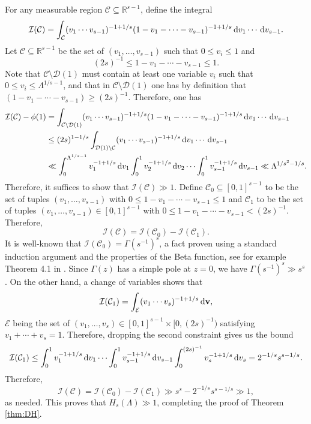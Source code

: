 \documentclass[11pt,reqno]{amsart}
\numberwithin{equation}{section}
\renewcommand{\d}{\,{\rm d}}
\begin{document}
For any measurable region $\mathcal{C} \subseteq \mathbb{R}^{s-1}$, define the integral
\[\mathcal{I}(\mathcal{C}) = \int_{\mathcal{C}} (v_1\cdots v_{s-1})^{-1+1/s} (1-v_1-\cdots-v_{s-1})^{-1+1/s}\d v_1\cdots \d v_{s-1}. \]
Let $\mathcal{C} \subseteq \mathbb{R}^{s-1}$ be the set of $(v_1,\ldots,v_{s-1})$ such that $0 \leq v_i \leq 1$ and 
\[ (2s)^{-1} \leq 1 -v_1-\cdots-v_{s-1} \leq 1. \]
Note that $\mathcal{C} \setminus \mathcal{D}(1)$ must contain at least one variable $v_i$ such that $0 \leq v_i \leq \Lambda^{1/s-1}$, and that in $\mathcal{C} \setminus \mathcal{D}(1) $ one has by definition that $(1-v_1-\cdots-v_{s-1}) \geq (2s)^{-1}$. Therefore, one has 
\begin{align*} \mathcal{I}(\mathcal{C})-\phi(1) & = \int_{\mathcal{C} \setminus \mathcal{D}(1)} (v_1\cdots v_{s-1})^{-1+1/s} (1-v_1-\cdots-v_{s-1})^{-1+1/s}\d v_1\cdots \d v_{s-1} 
\\ & \leq (2s)^{1-1/s} \int_{\mathcal{D}(1) \setminus \mathcal{C}} (v_1\cdots v_{s-1})^{-1+1/s}\d v_1\cdots \d v_{s-1}
\\ & \ll \int_0^{\Lambda^{1/s-1}} v_1^{-1+1/s}\d v_1 \int_0^1 v_2^{-1+1/s} \d v_2 \cdots \int_0^1 v_{s-1}^{-1+1/s}\d v_{s-1} \ll \Lambda^{1/s^2-1/s}. 
\end{align*}
Therefore, it suffices to show that $\mathcal{I}(\mathcal{C}) \gg 1$. Define $\mathcal{C}_0 \subseteq [0,1]^{s-1}$ to be the set of tuples $(v_1,\ldots,v_{s-1})$ with $0 \leq 1-v_1-\cdots-v_{s-1} \leq 1$ and $\mathcal{C}_1$ to be the set of tuples $(v_1,\ldots,v_{s-1}) \in [0,1]^{s-1}$ with $0 \leq 1-v_1-\cdots-v_{s-1} < (2s)^{-1}$. Therefore, 
\[ \mathcal{I}(\mathcal{C}) = \mathcal{I}(\mathcal{C}_0)- \mathcal{I}(\mathcal{C}_1). \]
It is well-known that $\mathcal{I}(\mathcal{C}_0) = \Gamma(s^{-1})^s$, a fact proven using a standard induction argument and the properties of the Beta function, see for example Theorem 4.1 in \cite{DavBook}.  
Since $\Gamma(z)$ has a simple pole at $z = 0$, we have $\Gamma(s^{-1})^s \gg s^s$. On the other hand, a change of variables shows that 
\[ \mathcal{I}(\mathcal{C}_1) = \int_{\mathcal{E}} (v_1\cdots v_s)^{-1+1/s} \d\mathbf{v}, \]
$\mathcal{E}$ being the set of $(v_1,\ldots, v_s) \in [0,1]^{s-1}\times [0,(2s)^{-1})$ satisfying $v_1+\cdots+v_s = 1$. Therefore, dropping the second constraint gives us the bound 
\begin{align*} 
\mathcal{I}(\mathcal{C}_1) \leq \int_{0}^1 v_1^{-1+1/s}\d v_1 \cdots \int_{0}^{1} v_{s-1}^{-1+1/s} \d v_{s-1} \int_0^{(2s)^{-1}} v_s^{-1+1/s} \d v_s = 2^{-1/s}s^{s-1/s}. 
\end{align*}
Therefore, 
\[ \mathcal{I}(\mathcal{C}) = \mathcal{I}(\mathcal{C}_0)- \mathcal{I}(\mathcal{C}_1) \gg s^s-2^{-1/s}s^{s-1/s} \gg 1, \]
as needed. This proves that $H_s(\Lambda) \gg 1$, completing the proof of Theorem \ref{thm:DH}. 
\end{document}
